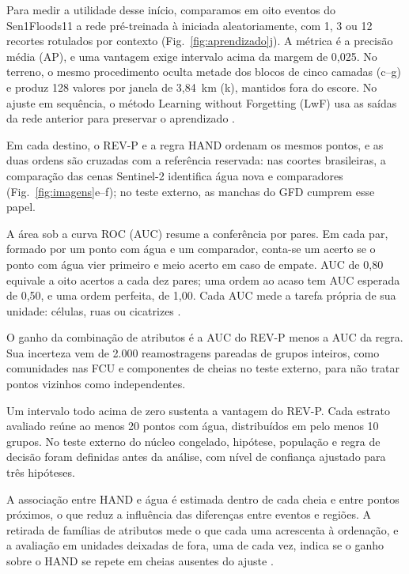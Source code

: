 \documentclass[conference]{IEEEtran}
\makeatletter
\def\subsection{\@startsection{subsection}{2}{\z@}{1.15ex plus .3ex minus .2ex}{0.3ex plus .2ex}{\normalfont\normalsize\itshape}}
\makeatother
\begin{document}
Para medir a utilidade desse início, comparamos em oito eventos do Sen1Floods11 a rede pré-treinada à iniciada aleatoriamente, com 1, 3 ou 12 recortes rotulados por contexto (Fig.~\ref{fig:aprendizado}j). A métrica é a precisão média (AP), e uma vantagem exige intervalo acima da margem de 0,025. No terreno, o mesmo procedimento oculta metade dos blocos de cinco camadas (c--g) e produz 128 valores por janela de 3,84~km (k), mantidos fora do escore. No ajuste em sequência, o método Learning without Forgetting (LwF) usa as saídas da rede anterior para preservar o aprendizado \cite{lwf}.

\subsection{Avaliação e atualização}
\label{sec:avaliacao}
Em cada destino, o REV-P e a regra HAND ordenam os mesmos pontos, e as duas ordens são cruzadas com a referência reservada: nas coortes brasileiras, a comparação das cenas Sentinel-2 identifica água nova e comparadores (Fig.~\ref{fig:imagens}e--f); no teste externo, as manchas do GFD cumprem esse papel.

A área sob a curva ROC (AUC) resume a conferência por pares. Em cada par, formado por um ponto com água e um comparador, conta-se um acerto se o ponto com água vier primeiro e meio acerto em caso de empate. AUC de 0,80 equivale a oito acertos a cada dez pares; uma ordem ao acaso tem AUC esperada de 0,50, e uma ordem perfeita, de 1,00. Cada AUC mede a tarefa própria de sua unidade: células, ruas ou cicatrizes \cite{wadoux}.

O ganho da combinação de atributos é a AUC do REV-P menos a AUC da regra. Sua incerteza vem de 2.000 reamostragens pareadas de grupos inteiros, como comunidades nas FCU e componentes de cheias no teste externo, para não tratar pontos vizinhos como independentes.

Um intervalo todo acima de zero sustenta a vantagem do REV-P. Cada estrato avaliado reúne ao menos 20 pontos com água, distribuídos em pelo menos 10 grupos. No teste externo do núcleo congelado, hipótese, população e regra de decisão foram definidas antes da análise, com nível de confiança ajustado para três hipóteses.

A associação entre HAND e água é estimada dentro de cada cheia e entre pontos próximos, o que reduz a influência das diferenças entre eventos e regiões. A retirada de famílias de atributos mede o que cada uma acrescenta à ordenação, e a avaliação em unidades deixadas de fora, uma de cada vez, indica se o ganho sobre o HAND se repete em cheias ausentes do ajuste \cite{peters}.
\end{document}
